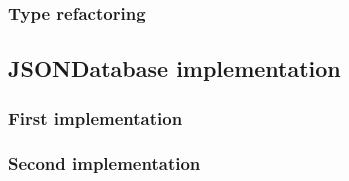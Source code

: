 \subsubsection{Type refactoring}

\subsection{JSONDatabase implementation}

\subsubsection{First implementation}

\subsubsection{Second implementation}

\newpage
